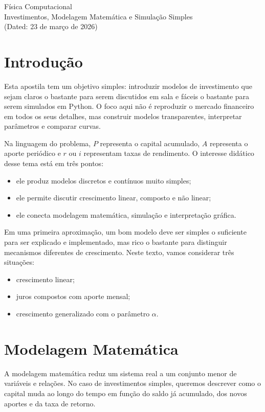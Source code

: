 \documentclass[11pt,a4paper]{article}
\newcommand{\tituloapostila}{
    \begin{center}
        {\LARGE Física Computacional}\\[0.25cm]
        {\Large Investimentos, Modelagem Matemática e Simulação Simples}\\[0.25cm]
        {\normalsize (Dated: 23 de março de 2026)}
    \end{center}
}
\begin{document}
\thispagestyle{plain}
\tituloapostila
\tableofcontents

\section{Introdução}

Esta apostila tem um objetivo simples: introduzir modelos de investimento que sejam
claros o bastante para serem discutidos em sala e fáceis o bastante para serem simulados
em Python. O foco aqui não é reproduzir o mercado financeiro em todos os seus detalhes,
mas construir modelos transparentes, interpretar parâmetros e comparar curvas.

Na linguagem do problema, \(P\) representa o capital acumulado, \(A\) representa o
aporte periódico e \(r\) ou \(i\) representam taxas de rendimento. O interesse didático
desse tema está em três pontos:

\begin{itemize}[leftmargin=*, itemsep=0.2em]
    \item ele produz modelos discretos e contínuos muito simples;
    \item ele permite discutir crescimento linear, composto e não linear;
    \item ele conecta modelagem matemática, simulação e interpretação gráfica.
\end{itemize}

Em uma primeira aproximação, um bom modelo deve ser simples o suficiente para ser
explicado e implementado, mas rico o bastante para distinguir mecanismos diferentes de
crescimento. Neste texto, vamos considerar três situações:

\begin{itemize}[leftmargin=*, itemsep=0.2em]
    \item crescimento linear;
    \item juros compostos com aporte mensal;
    \item crescimento generalizado com o parâmetro \(\alpha\).
\end{itemize}

\section{Modelagem Matemática}

A modelagem matemática reduz um sistema real a um conjunto menor de variáveis e
relações. No caso de investimentos simples, queremos descrever como o capital muda ao
longo do tempo em função do saldo já acumulado, dos novos aportes e da taxa de retorno.
\end{document}
